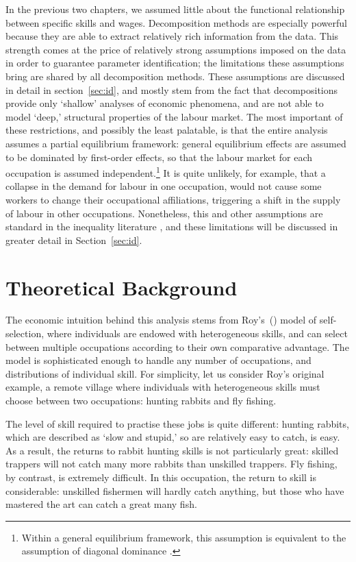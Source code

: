 In the previous two chapters, we assumed little about the functional relationship between specific skills and wages. Decomposition methods are especially powerful because they are able to extract relatively rich information from the data. This strength comes at the price of relatively strong assumptions imposed on the data in order to guarantee parameter identification; the limitations these assumptions bring are shared by all decomposition methods. These assumptions are discussed in detail in section~\ref{sec:id}, and mostly stem from the fact that decompositions provide only `shallow' analyses of economic phenomena, and are not able to model `deep,' structural properties of the labour market. The most important of these restrictions, and possibly the least palatable, is that the entire analysis assumes a partial equilibrium framework: general equilibrium effects are assumed to be dominated by first-order effects, so that the labour market for each occupation is assumed independent.\footnote{Within a general equilibrium framework, this assumption is equivalent to the assumption of diagonal dominance \citep[p.233]{Arrow1971}.} It is quite unlikely, for example, that a collapse in the demand for labour in one occupation, would not cause some workers to change their occupational affiliations, triggering a shift in the supply of labour in other occupations. Nonetheless, this and other assumptions are standard in the inequality literature \citep[p.1]{Fortin2011}, and these limitations will be discussed in greater detail in Section~\ref{sec:id}.

\section{Theoretical Background}

The economic intuition behind this analysis stems from Roy's~(\citeyear{Roy1951}) model of self-selection, where individuals are endowed with heterogeneous skills, and can select between multiple occupations according to their own comparative advantage. The model is sophisticated enough to handle any number of occupations, and distributions of individual skill. For simplicity, let us consider Roy's original example, a remote village where individuals with heterogeneous skills must choose between two occupations: hunting rabbits and fly fishing. 

The level of skill required to practise these jobs is quite different: hunting rabbits, which are described as `slow and stupid,' so are relatively easy to catch, is easy. As a result, the returns to rabbit hunting skills is not particularly great: skilled trappers will not catch many more rabbits than unskilled trappers. Fly fishing, by contrast, is extremely difficult. In this occupation, the return to skill is considerable: unskilled fishermen will hardly catch anything, but those who have mastered the art can catch a great many fish.

